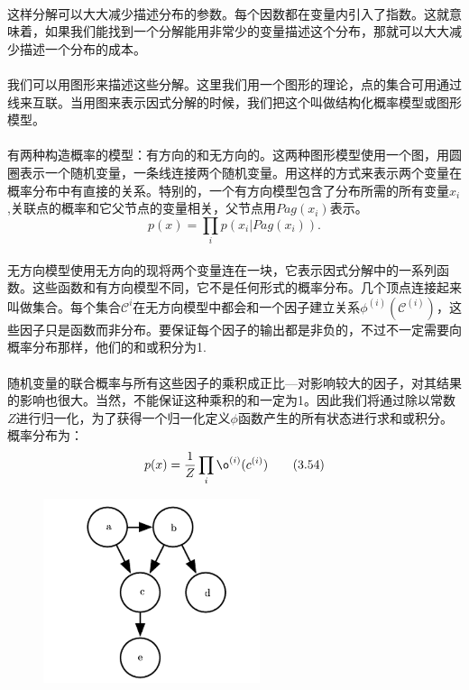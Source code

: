\documentclass{article}
\begin{document}
   \paragraph{}
   这样分解可以大大减少描述分布的参数。每个因数都在变量内引入了指数。这就意味着，如果我们能找到一个分解能用非常少的变量描述这个分布，那就可以大大减少描述一个分布的成本。
   \paragraph{}
   我们可以用图形来描述这些分解。这里我们用一个图形的理论，点的集合可用通过线来互联。当用图来表示因式分解的时候，我们把这个叫做结构化概率模型或图形模型。
   \paragraph{}
   有两种构造概率的模型：有方向的和无方向的。这两种图形模型使用一个图，用圆圈表示一个随机变量，一条线连接两个随机变量。用这样的方式来表示两个变量在概率分布中有直接的关系。特别的，一个有方向模型包含了分布所需的所有变量$x_{i}$,关联点的概率和它父节点的变量相关，父节点用$Pag(x_{i})$表示。
   \begin{equation}
   p(x)=\prod_{i}p(x_{i}|Pag(x_{i})).\tag{3.53}
   \end{equation}

   \paragraph{}
   无方向模型使用无方向的现将两个变量连在一块，它表示因式分解中的一系列函数。这些函数和有方向模型不同，它不是任何形式的概率分布。几个顶点连接起来叫做集合。每个集合$\mathcal{C}^{i}$在无方向模型中都会和一个因子建立关系$\phi^{(i)}(\mathcal{C}^{(i)})$，这些因子只是函数而非分布。要保证每个因子的输出都是非负的，不过不一定需要向概率分布那样，他们的和或积分为1.

   \paragraph{}
   随机变量的联合概率与所有这些因子的乘积成正比—对影响较大的因子，对其结果的影响也很大。当然，不能保证这种乘积的和一定为1。因此我们将通过除以常数$Z$进行归一化，为了获得一个归一化定义$\phi$函数产生的所有状态进行求和或积分。概率分布为：
   \begin{equation}
   p(x)=\frac{1}{Z}\prod_{i}{\o}^{(i)}(c^{(i)}) \tag{3.54}
   \end{equation}
   \begin{figure}[!htb]
   \centering
   \centerline{\includegraphics[width=2.5in]{fig/chap3/3_7.png}}
   \label*{图:3.7}
   \end{figure}
\end{document}
